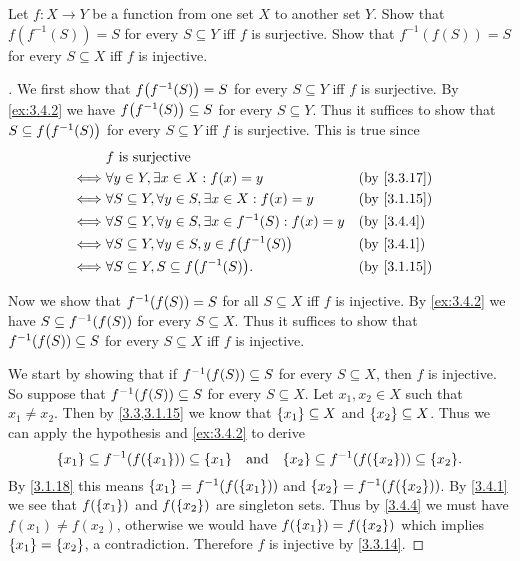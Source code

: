 \begin{ex}\label{ex:3.4.5}
  Let \(f : X \to Y\) be a function from one set \(X\) to another set \(Y\).
  Show that \(f(f^{-1}(S)) = S\) for every \(S \subseteq Y\) iff \(f\) is surjective.
  Show that \(f^{-1}(f(S)) = S\) for every \(S \subseteq X\) iff \(f\) is injective.
\end{ex}

\begin{proof}[]
  We first show that \(f\pa{f^{-1}(S)} = S\) for every \(S \subseteq Y\) iff \(f\) is surjective.
  By \cref{ex:3.4.2} we have \(f\pa{f^{-1}(S)} \subseteq S\) for every \(S \subseteq Y\).
  Thus it suffices to show that \(S \subseteq f\pa{f^{-1}(S)}\) for every \(S \subseteq Y\) iff \(f\) is surjective.
  This is true since
  \begin{align*}
         & f \text{ is surjective}                                                                     \\
    \iff & \forall y \in Y, \exists x \in X : f(x) = y                                &  & \by{3.3.17} \\
    \iff & \forall S \subseteq Y, \forall y \in S, \exists x \in X : f(x) = y         &  & \by{3.1.15} \\
    \iff & \forall S \subseteq Y, \forall y \in S, \exists x \in f^{-1}(S) : f(x) = y &  & \by{3.4.4}  \\
    \iff & \forall S \subseteq Y, \forall y \in S, y \in f\pa{f^{-1}(S)}              &  & \by{3.4.1}  \\
    \iff & \forall S \subseteq Y, S \subseteq f\pa{f^{-1}(S)}.                        &  & \by{3.1.15}
  \end{align*}

  Now we show that \(f^{-1}\pa{f(S)} = S\) for all \(S \subseteq X\) iff \(f\) is injective.
  By \cref{ex:3.4.2} we have \(S \subseteq f^{-1}\pa{f(S)}\) for every \(S \subseteq X\).
  Thus it suffices to show that \(f^{-1}\pa{f(S)} \subseteq S\) for every \(S \subseteq X\) iff \(f\) is injective.

  We start by showing that if \(f^{-1}\pa{f(S)} \subseteq S\) for every \(S \subseteq X\), then \(f\) is injective.
  So suppose that \(f^{-1}\pa{f(S)} \subseteq S\) for every \(S \subseteq X\).
  Let \(x_1, x_2 \in X\) such that \(x_1 \neq x_2\).
  Then by \cref{3.3,3.1.15} we know that \(\left\lbrace x_1\right\rbrace \subseteq X\) and \(\left\lbrace x_2\right\rbrace \subseteq X\).
  Thus we can apply the hypothesis and \cref{ex:3.4.2} to derive
  \[
    \set{x_1} \subseteq f^{-1}\pa{f\pa{\set{x_1}}} \subseteq \set{x_1} \quad \text{and} \quad \set{x_2} \subseteq f^{-1}\pa{f\pa{\set{x_2}}} \subseteq \set{x_2}.
  \]
  By \cref{3.1.18} this means \(\set{x_1} = f^{-1}\pa{f\pa{\set{x_1}}}\) and \(\set{x_2} = f^{-1}\pa{f\pa{\set{x_2}}}\).
  By \cref{3.4.1} we see that \(f\pa{\set{x_1}}\) and \(f\pa{\set{x_2}}\) are singleton sets.
  Thus by \cref{3.4.4} we must have \(f(x_1) \neq f(x_2)\), otherwise we would have \(f(\left\lbrace x_1\right\rbrace) = f(\left\lbrace x_2\right\rbrace)\) which implies \(\left\lbrace x_1\right\rbrace = \left\lbrace x_2\right\rbrace\), a contradiction.
  Therefore \(f\) is injective by \cref{3.3.14}.


\end{proof}
